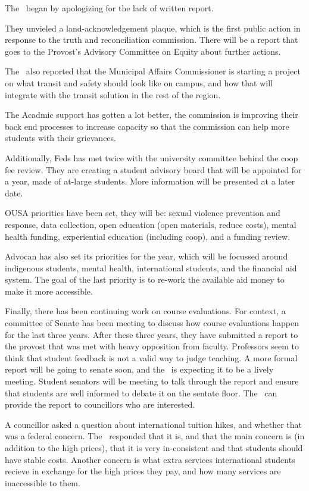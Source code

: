 \begin{information}

    The \vpe\ began by apologizing for the lack of written report. 
    
    They unvieled a land-acknowledgement plaque, which is the first public 
    action in response to the truth and reconciliation commission. There will 
    be a report that goes to the Provost's Advisory Committee on Equity about 
    further actions. 

    The \vpe\ also reported that the Municipal Affairs Commissioner is 
    starting a project on what transit and safety should look like on campus, 
    and how that will integrate with the transit solution in the rest of the 
    region. 

    The Acadmic support has gotten a lot better, the commission is improving their
    back end processes to increase capacity so that the commission can help 
    more students with their grievances.

    Additionally, Feds has met twice with the university committee behind the 
    coop fee review.  They are creating a student advisory board that will be 
    appointed for a year, made of at-large students. More information 
    will be presented at a later date. 

    OUSA priorities have been set, they will be: sexual violence prevention and 
    response, data collection, open education (open materials, reduce costs), 
    mental health funding, experiential education (including coop), and 
    a funding review. 

    Advocan has also set its priorities for the year, which will be focussed 
    around indigenous students, mental health, international students, and 
    the financial aid system. The goal of the last priority is to re-work the 
    available aid money to make it more accessible. 

    Finally, there has been continuing work on course evaluations. For context,
    a committee of Senate has been meeting to discuss how course evaluations 
    happen for the last three years. After these three years, they have 
    submitted a report to the provost that was met with heavy opposition 
    from faculty. Professors seem to think that student feedback is not a 
    valid way to judge teaching. A more formal report will be going to senate 
    soon, and the \vpe\ is expecting it to be a lively meeting. 
    Student senators will be meeting to talk through the report and ensure that
    students are well informed to debate it on the sentate floor. The \vpe\ can 
    provide the report to councillors who are interested. 

    A councillor asked a question about international tuition hikes, and 
    whether that was a federal concern. The \vpe\ responded that it is, and 
    that the main concern is (in addition to the high prices), that it is very 
    in-consistent and that students should have stable costs. Another concern 
    is what extra services international students recieve in exchange for the 
    high prices they pay, and how many services are inaccessible to them. 
\end{information}

